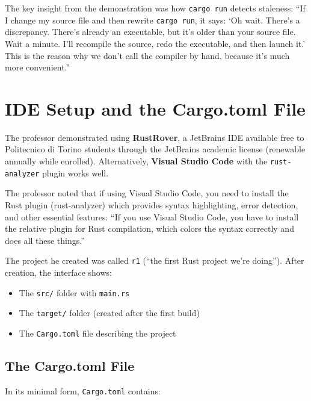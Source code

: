 The key insight from the demonstration was how \texttt{cargo run} detects staleness: ``If I change my source file and then rewrite \texttt{cargo run}, it says: `Oh wait. There's a discrepancy. There's already an executable, but it's older than your source file. Wait a minute. I'll recompile the source, redo the executable, and then launch it.' This is the reason why we don't call the compiler by hand, because it's much more convenient.''

\section{IDE Setup and the Cargo.toml File}

The professor demonstrated using \textbf{RustRover}, a JetBrains IDE available free to Politecnico di Torino students through the JetBrains academic license (renewable annually while enrolled). Alternatively, \textbf{Visual Studio Code} with the \texttt{rust-analyzer} plugin works well.

\begin{insightbox}
The professor noted that if using Visual Studio Code, you need to install the Rust plugin (rust-analyzer) which provides syntax highlighting, error detection, and other essential features: ``If you use Visual Studio Code, you have to install the relative plugin for Rust compilation, which colors the syntax correctly and does all these things.''
\end{insightbox}

The project he created was called \texttt{r1} (``the first Rust project we're doing''). After creation, the interface shows:

\begin{itemize}
    \item The \texttt{src/} folder with \texttt{main.rs}
    \item The \texttt{target/} folder (created after the first build)
    \item The \texttt{Cargo.toml} file describing the project
\end{itemize}

\subsection{The Cargo.toml File}

In its minimal form, \texttt{Cargo.toml} contains:

